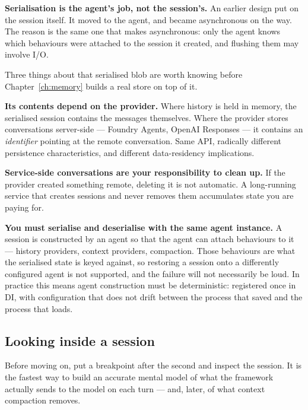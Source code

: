\begin{note}
\textbf{Serialisation is the agent's job, not the session's.} An earlier design
put  on the session itself. It moved to the agent, and became
asynchronous on the way. The reason is the same one that makes
 asynchronous: only the agent knows which behaviours were
attached to the session it created, and flushing them may involve I/O.
\end{note}

Three things about that serialised blob are worth knowing before
Chapter~\ref{ch:memory} builds a real store on top of it.

\textbf{Its contents depend on the provider.} Where history is held in memory,
the serialised session contains the messages themselves. Where the provider
stores conversations server-side --- Foundry Agents, OpenAI Responses --- it
contains an \emph{identifier} pointing at the remote conversation. Same API,
radically different persistence characteristics, and different data-residency
implications.

\textbf{Service-side conversations are your responsibility to clean up.} If the
provider created something remote, deleting it is not automatic. A long-running
service that creates sessions and never removes them accumulates state you are
paying for.

\begin{warning}
\textbf{You must serialise and deserialise with the same agent instance.}
A session is constructed by an agent so that the agent can attach behaviours to
it --- history providers, context providers, compaction. Those behaviours are
what the serialised state is keyed against, so restoring a session onto a
differently configured agent is not supported, and the failure will not
necessarily be loud. In practice this means agent construction must be
deterministic: registered once in DI, with configuration that does not drift
between the process that saved and the process that loads.
\end{warning}

\subsection{Looking inside a session}

Before moving on, put a breakpoint after the second  and inspect
the session. It is the fastest way to build an accurate mental model of what the
framework actually sends to the model on each turn --- and, later, of what
context compaction removes.

